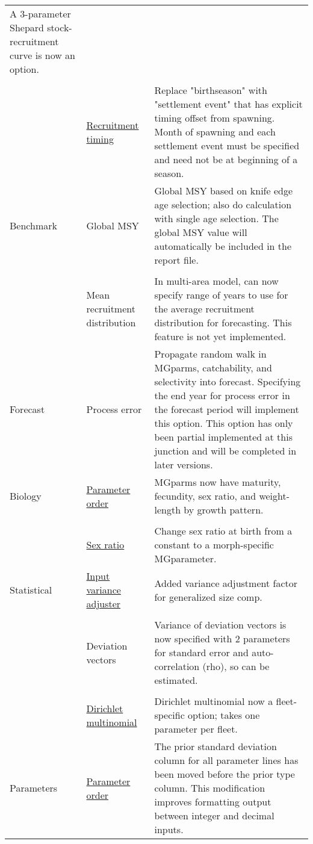 \documentclass[12pt]{article}
\begin{document}
\begin{center}
\begin{longtable}{p{2cm} p{3cm} p{10cm}}
	A 3-parameter Shepard stock-recruitment curve is now an option.\\
	\\
	& \hyperlink{RecrTiming}{Recruitment timing} & 
	Replace "birthseason" with "settlement event" that has explicit timing offset from spawning.  Month of spawning and each settlement event must be specified and need not be at beginning of a season.\\
	\hline
	Benchmark 
	& Global MSY &  
	Global MSY based on knife edge age selection; also do calculation with single age selection. The global MSY value will automatically be included in the report file.\\
	\\					
	& Mean recruitment distribution & 
	In multi-area model, can now specify range of years to use for the average recruitment distribution for forecasting. This feature is not yet implemented. \\
	\hline
	Forecast & 
	Process error & 
	Propagate random walk in MGparms, catchability, and selectivity into forecast. Specifying the end year for process error in the forecast period will implement this option.  This option has only been partial implemented at this junction and will be completed in later versions.\\
	\hline
	Biology 
	& \hyperlink{MGorder}{Parameter order} & 
	MGparms now have maturity, fecundity, sex ratio, and weight-length by growth pattern.\\
	\\						
	& \hyperlink{SexRatio}{Sex ratio} & 
	Change sex ratio at birth from a constant to a morph-specific MGparameter. \\
	\hline
	Statistical 
	& \hyperlink{GcompVar}{Input variance adjuster} & 
	Added variance adjustment factor for generalized size comp. \\
	\\						
	& Deviation vectors & 
	Variance of deviation vectors is now specified with 2 parameters for standard error and auto-correlation (rho), so can be estimated.\\
	\\						
	& \hyperlink{Dirichlet}{Dirichlet multinomial} & 
	Dirichlet multinomial now a fleet-specific option; takes one parameter per fleet. \\
	\hline
	Parameters 
	& \hyperlink{paraOrder}{Parameter order} & The prior standard deviation column for all parameter lines has been moved before the prior type column.  This modification improves formatting output between integer and decimal inputs.\\ 

\end{longtable}
\end{center}
\end{document}
